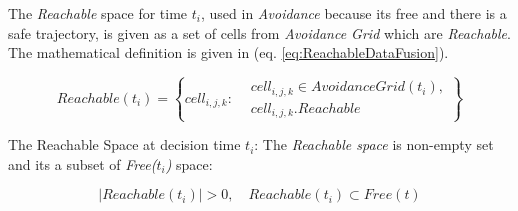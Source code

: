 \noindent The \emph{Reachable} space for time $t_i$, used in \emph{Avoidance} because its free and there is a safe trajectory, is given as a set of cells from \emph{Avoidance Grid} which are \emph{Reachable}. The mathematical definition is given in (eq. \ref{eq:ReachableDataFusion}).

\begin{equation}\label{eq:ReachableDataFusion}
    Reachable(t_i) = \left\{cell_{i,j,k}:\begin{aligned}&cell_{i,j,k}\in AvoidanceGrid(t_i),\\&cell_{i,j,k}.Reachable\end{aligned}\right\}
\end{equation}

\begin{note}{The Reachable Space at decision time $t_i$:}
The \emph{Reachable space} is non-empty set and its a subset of \emph{Free($t_i$)} space:    

\begin{equation}\label{eq:reachableDataFusionConstraints}
    |Reachable(t_i)| > 0, \quad Reachable(t_i) \subset Free(t)
\end{equation}
\end{note}